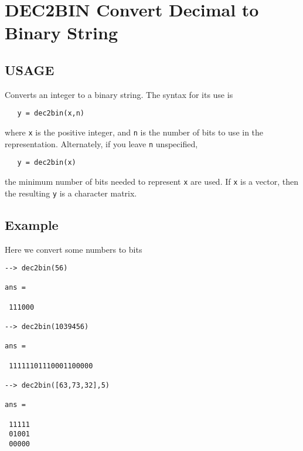\section{DEC2BIN Convert Decimal to Binary String}

\subsection{USAGE}

Converts an integer to a binary string.  The syntax for its
use is
\begin{verbatim}
   y = dec2bin(x,n)
\end{verbatim}
where \verb|x| is the positive integer, and \verb|n| is the number of
bits to use in the representation.  Alternately, if you leave
\verb|n| unspecified, 
\begin{verbatim}
   y = dec2bin(x)
\end{verbatim}
the minimum number of bits needed to represent \verb|x| are used.
If \verb|x| is a vector, then the resulting \verb|y| is a character
matrix.
\subsection{Example}

Here we convert some numbers to bits
\begin{verbatim}
--> dec2bin(56)

ans = 

 111000

--> dec2bin(1039456)

ans = 

 11111101110001100000

--> dec2bin([63,73,32],5)

ans = 

 11111
 01001
 00000
\end{verbatim}
